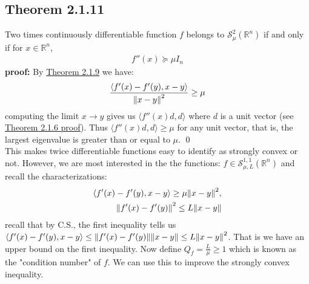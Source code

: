 \documentclass[12pt,a4paper]{article}
\begin{document}
	 \subsection*{Theorem 2.1.11}\label{thm2111}
	 Two times continuously differentiable function $f$ belongs to $\mathcal{S}_{\mu}^{2}(\mathbb{R}^n)$ if and only if for $x \in \mathbb{R}^n$,
	 \begin{align*}
	 	f''(x) \succeq \mu I_n
	 \end{align*} 
	 \textbf{proof:} By \hyperref[thm219]{Theorem 2.1.9} we have:
	 \begin{align*}
	 	\frac{\langle f'(x) - f'(y), x - y \rangle}{\norm{x - y}^2} \geq \mu
	 \end{align*}
	 computing the limit $x \rightarrow y$ gives us $\langle f''(x)d, d \rangle$ where $d$ is a unit vector (see \hyperref[thm216]{Theorem 2.1.6 proof}). Thus $\langle f''(x)d, d \rangle \geq \mu$ for any unit vector, that is, the largest eigenvalue is greater than or equal to $\mu$. \qed \\
	 This makes twice differentiable functions easy to identify as strongly convex or not. However, we are most interested in the the functions: $f \in \mathcal{S}_{\mu, L}^{1,1}(\mathbb{R}^n)$ and recall the characterizations:
	 \begin{align}
	 	\langle f'(x) - f'(y), x - y \rangle \geq \mu \norm{x - y}^2 ,\\
	 	\norm{f'(x) - f'(y)}^2 \leq L\norm{x - y}
	 \end{align}
	 recall that by C.S., the first inequality tells us $\langle f'(x) - f'(y), x - y \rangle \leq \norm{f'(x) - f'(y)}\norm{x - y} \leq L \norm{x - y}^2$. That is we have an upper bound on the first inequality. Now define $Q_f = \frac{L}{\mu}\geq 1$ which is known as the "condition number" of $f$. We can use this to improve the strongly convex inequality.
\end{document}
